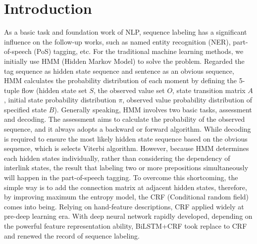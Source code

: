 \documentclass[10pt,twocolumn,letterpaper]{article}
\begin{document}
\section{Introduction}
As a basic task and foundation work of NLP, sequence labeling has a significant
influence on the follow-up works, such as named entity recognition (NER), 
part-of-speech (PoS) tagging, etc. For the traditional machine learning methods, 
we initially use HMM (Hidden Markov Model) to solve the problem. Regarded the tag 
sequence as hidden state sequence and sentence as an obvious sequence, HMM calculates
the probability distribution of each moment by defining the 5-tuple flow (hidden state
set $S$, the observed value set $O$, state transition matrix $A$, initial state probability
distribution $\pi$, observed value probability distribution of specified state $B$).
Generally speaking, HMM involves two basic tasks, assessment and decoding. The assessment aims
to calculate the probability of the observed sequence, and it always adopts a backward or forward
algorithm. While decoding is required to ensure the most likely hidden state sequence
based on the obvious sequence, which is selects Viterbi algorithm. However, because
HMM determines each hidden states individually, rather than considering the dependency 
of interlink states, the result that labeling two or more prepositions simultaneously will 
happen in the part-of-speech tagging. To overcome this shortcoming, the simple way is to
add the connection matrix at adjacent hidden states, therefore, by improving maximum the 
entropy model, the CRF (Conditional random field) comes into being. Relying on hand-feature
descriptions, CRF applied widely at pre-deep learning era. With deep neural network rapidly
developed, depending on the powerful feature representation ability, BiLSTM+CRF 
took replace to CRF and renewed the record of sequence labeling.
\end{document}
